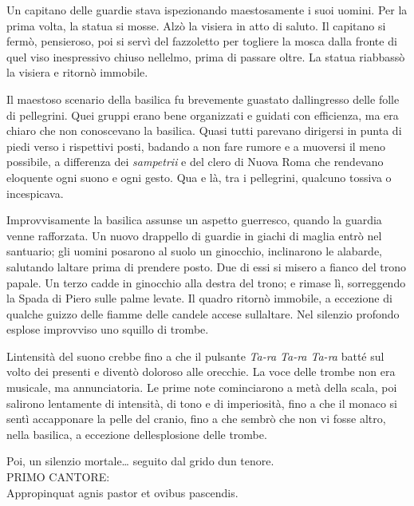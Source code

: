 Un capitano delle guardie stava ispezionando maestosamente i suoi
uomini. Per la prima volta, la statua si mosse. Alzò la visiera in atto
di saluto. Il capitano si fermò, pensieroso, poi si servì del fazzoletto
per togliere la mosca dalla fronte di quel viso inespressivo chiuso
nell\textquotesingle elmo, prima di passare oltre. La statua riabbassò
la visiera e ritornò immobile.

Il maestoso scenario della basilica fu brevemente guastato
dall\textquotesingle ingresso delle folle di pellegrini. Quei gruppi
erano bene organizzati e guidati con efficienza, ma era chiaro che non
conoscevano la basilica. Quasi tutti parevano dirigersi in punta di
piedi verso i rispettivi posti, badando a non fare rumore e a muoversi
il meno possibile, a differenza dei \emph{sampetrii} e del clero di
Nuova Roma che rendevano eloquente ogni suono e ogni gesto. Qua e là,
tra i pellegrini, qualcuno tossiva o incespicava.

Improvvisamente la basilica assunse un aspetto guerresco, quando la
guardia venne rafforzata. Un nuovo drappello di guardie in giachi di
maglia entrò nel santuario; gli uomini posarono al suolo un ginocchio,
inclinarono le alabarde, salutando l\textquotesingle altare prima di
prendere posto. Due di essi si misero a fianco del trono papale. Un
terzo cadde in ginocchio alla destra del trono; e rimase lì, sorreggendo
la Spada di Piero sulle palme levate. Il quadro ritornò immobile, a
eccezione di qualche guizzo delle fiamme delle candele accese
sull\textquotesingle altare. Nel silenzio profondo esplose improvviso
uno squillo di trombe.

L\textquotesingle intensità del suono crebbe fino a che il pulsante
\emph{Ta-ra Ta-ra Ta-ra} batté sul volto dei presenti e diventò doloroso
alle orecchie. La voce delle trombe non era musicale, ma annunciatoria.
Le prime note cominciarono a metà della scala, poi salirono lentamente
di intensità, di tono e di imperiosità, fino a che il monaco si sentì
accapponare la pelle del cranio, fino a che sembrò che non vi fosse
altro, nella basilica, a eccezione dell\textquotesingle esplosione delle
trombe.

Poi, un silenzio mortale\ldots{} seguito dal grido d\textquotesingle un
tenore.
\leavevmode\\

PRIMO CANTORE:
\leavevmode\\

Appropinquat agnis pastor et ovibus pascendis.
\leavevmode\\

